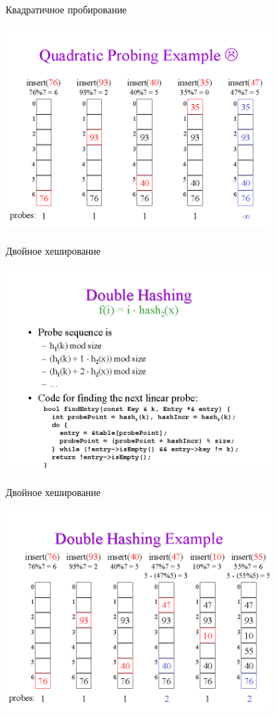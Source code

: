 \documentclass[10pt]{beamer}
\begin{document}
\begin{frame}[fragile]{Квадратичное пробирование}
\begin{center}
    \includegraphics[width=10cm, height=7.7cm]{Term_1/Source/Pirctures/img019.png}
\end{center}
\end{frame}

\begin{frame}[fragile]{Двойное хеширование}
\begin{center}
    \includegraphics[width=10cm, height=7.7cm]{Term_1/Source/Pirctures/img023.png}
\end{center}
\end{frame}

\begin{frame}[fragile]{Двойное хеширование}
\begin{center}
    \includegraphics[width=10cm, height=7.7cm]{Term_1/Source/Pirctures/img025.png}
\end{center}
\end{frame}
\end{document}
